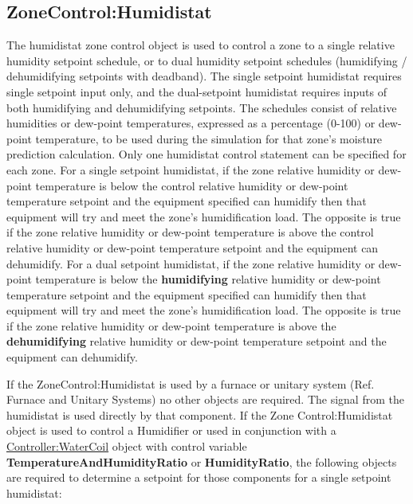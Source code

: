 \subsection{ZoneControl:Humidistat}\label{zonecontrolhumidistat}

The humidistat zone control object is used to control a zone to a single relative humidity setpoint schedule, or to dual humidity setpoint schedules (humidifying / dehumidifying setpoints with deadband). The single setpoint humidistat requires single setpoint input only, and the dual-setpoint humidistat requires inputs of both humidifying and dehumidifying setpoints. The schedules consist of relative humidities or dew-point temperatures, expressed as a percentage (0-100) or dew-point temperature, to be used during the simulation for that zone's moisture prediction calculation. Only one humidistat control statement can be specified for each zone. For a single setpoint humidistat, if the zone relative humidity or dew-point temperature is below the control relative humidity or dew-point temperature setpoint and the equipment specified can humidify then that equipment will try and meet the zone's humidification load. The opposite is true if the zone relative humidity or dew-point temperature is above the control relative humidity or dew-point temperature setpoint and the equipment can dehumidify. For a dual setpoint humidistat, if the zone relative humidity or dew-point temperature is below the \textbf{humidifying} relative humidity or dew-point temperature setpoint and the equipment specified can humidify then that equipment will try and meet the zone's humidification load. The opposite is true if the zone relative humidity or dew-point temperature is above the \textbf{dehumidifying} relative humidity or dew-point temperature setpoint and the equipment can dehumidify.

If the ZoneControl:Humidistat is used by a furnace or unitary system (Ref. Furnace and Unitary Systems) no other objects are required. The signal from the humidistat is used directly by that component. If the Zone Control:Humidistat object is used to control a Humidifier or used in conjunction with a \hyperref[controllerwatercoil]{Controller:WaterCoil} object with control variable \textbf{TemperatureAndHumidityRatio} or \textbf{HumidityRatio}, the following objects are required to determine a setpoint for those components for a single setpoint humidistat:


